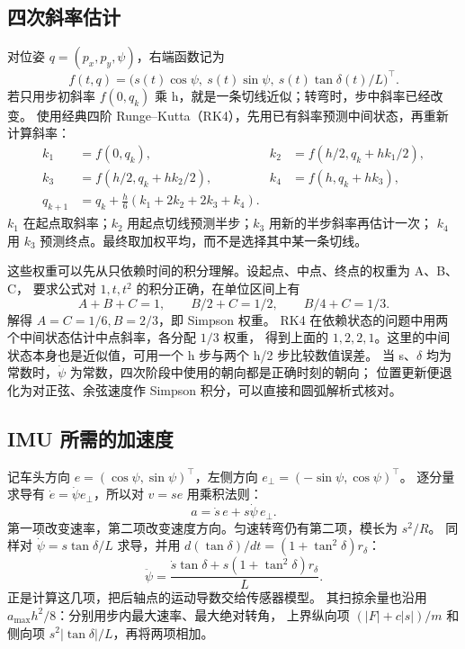 \subsection*{四次斜率估计}
对位姿 $q=(p_x,p_y,\psi)$，右端函数记为
\begin{equation}
f(t,q)=\big(s(t)\cos\psi,\ s(t)\sin\psi,\ s(t)\tan\delta(t)/L\big)^\top.
\end{equation}
若只用步初斜率 $f(0,q_k)$ 乘 h，就是一条切线近似；转弯时，步中斜率已经改变。
 使用经典四阶 Runge--Kutta（RK4），先用已有斜率预测中间状态，再重新计算斜率：
\begin{align}
k_1&=f(0,q_k),&k_2&=f(h/2,q_k+hk_1/2),\\
k_3&=f(h/2,q_k+hk_2/2),&k_4&=f(h,q_k+hk_3),\\
q_{k+1}&=q_k+\frac h6(k_1+2k_2+2k_3+k_4).&&
\end{align}
$k_1$ 在起点取斜率；$k_2$ 用起点切线预测半步；$k_3$ 用新的半步斜率再估计一次；
$k_4$ 用 $k_3$ 预测终点。最终取加权平均，而不是选择其中某一条切线。

这些权重可以先从只依赖时间的积分理解。设起点、中点、终点的权重为 A、B、C，
要求公式对 $1,t,t^2$ 的积分正确，在单位区间上有
\begin{equation}
A+B+C=1,\qquad B/2+C=1/2,\qquad B/4+C=1/3.
\end{equation}
解得 $A=C=1/6,B=2/3$，即 Simpson 权重。
RK4 在依赖状态的问题中用两个中间状态估计中点斜率，各分配 $1/3$ 权重，
得到上面的 $1,2,2,1$。这里的中间状态本身也是近似值，可用一个 h 步与两个 h/2 步比较数值误差。
当 s、$\delta$ 均为常数时，$\dot\psi$ 为常数，四次阶段中使用的朝向都是正确时刻的朝向；
位置更新便退化为对正弦、余弦速度作 Simpson 积分，可以直接和圆弧解析式核对。

\subsection*{IMU 所需的加速度}
记车头方向 $e=(\cos\psi,\sin\psi)^\top$，左侧方向 $e_\perp=(-\sin\psi,\cos\psi)^\top$。
逐分量求导有 $\dot e=\dot\psi e_\perp$，所以对 $v=se$ 用乘积法则：
\begin{equation}
a=\dot s\,e+s\dot\psi\,e_\perp.
\end{equation}
第一项改变速率，第二项改变速度方向。匀速转弯仍有第二项，模长为 $s^2/R$。
同样对 $\dot\psi=s\tan\delta/L$ 求导，并用
$d(\tan\delta)/dt=(1+\tan^2\delta)r_\delta$：
\begin{equation}
\ddot\psi=\frac{\dot s\tan\delta+s(1+\tan^2\delta)r_\delta}{L}.
\end{equation}
 正是计算这几项，把后轴点的运动导数交给传感器模型。
其扫掠余量也沿用 $a_{\max}h^2/8$：分别用步内最大速率、最大绝对转角，
上界纵向项 $(|F|+c|s|)/m$ 和侧向项 $s^2|\tan\delta|/L$，再将两项相加。

